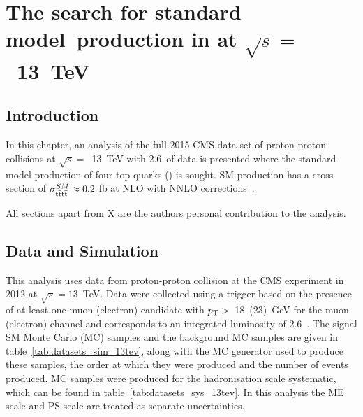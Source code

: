 \chapter{The search for standard model~\tttt production in \runtwo at $\sqrt{s} =$~13~TeV \label{c:Run2}}
\section{Introduction}
In this chapter, an analysis of the full 2015 CMS data set of proton-proton collisions at $\sqrt{s} =$~13~TeV with 2.6~\fbinv of data is presented where the standard model production of four top quarks (\tttt) is sought. SM \tttt production has a cross section of $\sigma_{{\mathrm{t}\overline{\mathrm{t}}\mathrm{t}\overline{\mathrm{t}}}}^{SM}  \approx 0.2$ fb at NLO with NNLO corrections~\cite{Barger201070,Bevilacqua2012}. 

All sections apart from X are the authors personal contribution to the analysis.

\section{Data and Simulation}
\label{sec:datasimulation13}
This analysis uses data from proton-proton collision at the CMS experiment in 2012 at $\sqrt{s}=13$~TeV.
Data were collected using a trigger based on the presence of at least one muon (electron) candidate with $p_{\mathrm{T}} > $~18~(23)~GeV for the muon (electron) channel and corresponds to an integrated luminosity of 2.6~\fbinv .
The signal SM \tttt Monte Carlo (MC) samples and the background MC samples are given in table~\ref{tab:datasets_sim_13tev}, along with the MC generator used to produce these samples, the order at which they were produced and the number of events produced. MC samples were produced for the hadronisation scale systematic, which can be found in table~\ref{tab:datasets_sys_13tev}. In this analysis the ME scale and PS scale are treated as separate uncertainties.

